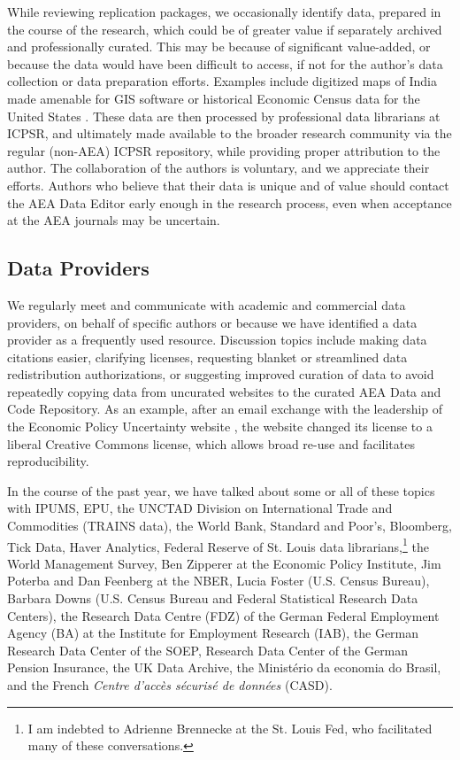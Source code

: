 \documentclass[PP]{AEA}
\newcommand{\aeadcr}{AEA Data and Code Repository}
\begin{document}
While reviewing replication packages, we occasionally identify data, prepared in the course of the research, which could be of greater value if separately archived and professionally curated. This may be because of significant value-added, or because the data would have been difficult to access, if not for the author's data collection or data preparation efforts. Examples include digitized maps of India made amenable for GIS software \citep{10.1257/aer.20171673} or historical Economic Census data for the United States \citep{ganapati2020}. These data are then processed by professional data librarians at ICPSR, and ultimately made available to the broader research community via the regular (non-AEA) ICPSR repository, while providing proper attribution to the author. The collaboration of the authors is voluntary, and we appreciate their efforts. Authors who believe that their data is unique and of value should contact the AEA Data Editor early enough in the research process, even when acceptance at the AEA journals may be uncertain. 

\subsection{Data Providers}
\label{sec:producers}

We regularly meet and communicate with academic and commercial data providers, on behalf of specific authors or because we have identified a data provider as a frequently used resource. Discussion topics include making data citations easier, clarifying licenses, requesting blanket or streamlined data redistribution authorizations, or suggesting improved curation of data to avoid repeatedly copying data from uncurated websites to the curated \aeadcr{}. As an example, after an email exchange with the leadership of the Economic Policy Uncertainty website \citep{10.1093/qje/qjw024}, the website changed its license to a liberal Creative Commons license, which allows broad re-use and facilitates reproducibility.

In the course of the past year, we have talked about some or all of these topics with IPUMS, EPU, the UNCTAD Division on International Trade and Commodities (TRAINS data), the World Bank, Standard and Poor's, Bloomberg, Tick Data, Haver Analytics, Federal Reserve of St. Louis data librarians,\footnote{I am indebted to  Adrienne Brennecke at the St. Louis Fed, who facilitated many of these conversations.} the World Management Survey, Ben Zipperer at the Economic Policy Institute, Jim Poterba and Dan Feenberg at the NBER, Lucia Foster (U.S. Census Bureau), Barbara Downs (U.S. Census Bureau and Federal Statistical Research Data Centers), the Research Data Centre (FDZ) of the German Federal Employment Agency (BA) at the Institute for Employment Research (IAB), the German Research Data Center of the SOEP, Research Data Center of the German Pension Insurance, the UK Data Archive, the Ministério da economia do Brasil, and the French \textit{Centre d'accès sécurisé de données} (CASD). 
\end{document}
